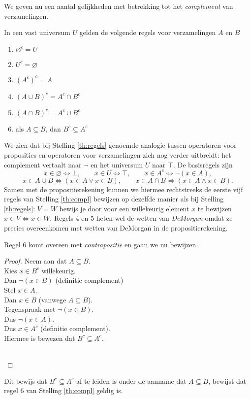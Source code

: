 We geven nu een aantal gelijkheden met betrekking tot het \textit{complement} van verzamelingen.
\begin{theorem}
In een vast universum $U$ gelden de volgende regels voor verzamelingen $A$ en $B$
\begin{enumerate}
    \item $\varnothing^c=U$
    \item $U^c=\varnothing$
    \item $(A^c)^c=A$
    \item $(A\cup B)^c=A^c\cap B^c$
    \item $(A\cap B)^c=A^c\cup B^c$
    \item als $A\subseteq B$, dan $B^c\subseteq A^c$
\end{enumerate}\label{th:compl}
\end{theorem}
We zien dat bij Stelling \ref{th:regels} genoemde analogie tussen operatoren voor proposities en operatoren voor verzamelingen zich nog verder uitbreidt: het complement vertaalt naar $\neg$ en het universum $U$ naar $\top$. De basisregels zijn
$$x\in\varnothing\Leftrightarrow\bot,\qquad x\in U\Leftrightarrow\top,\qquad x\in A^c\Leftrightarrow\neg(x\in A),$$
$$x\in A\cup B\Leftrightarrow(x\in A\lor x\in B),\qquad x\in A\cap B\Leftrightarrow(x\in A\land x\in B).$$
Samen met de propositierekening kunnen we hiermee rechtstreeks de eerste vijf regels van Stelling \ref{th:compl} bewijzen op dezelfde manier als bij Stelling \ref{th:regels}: $V=W$ bewijs je door voor een willekeurig element $x$ te bewijzen $x\in V\Leftrightarrow x\in W$. Regels 4 en 5 heten wel de wetten van \textit{DeMorgan} omdat ze precies overeenkomen met wetten van DeMorgan in de propositierekening.

Regel 6 komt overeen met \textit{contrapositie} en gaan we nu bewijzen.
\begin{proof}\mbox{}

\begin{minipage}{.8\textwidth}
Neem aan dat $A\subseteq B$.\\
Kies $x\in B^c$ willekeurig.\\
Dan $\neg(x\in B)$ (definitie complement)\\
Stel $x\in A$.\\
Dan $x\in B$ (vanwege $A\subseteq B$).\\
Tegenspraak met $\neg(x\in B)$.\\
Dus $\neg(x\in A)$.\\
Dus $x\in A^c$ (definitie complement).\\
Hiermee is bewezen dat $B^c\subseteq A^c$.
\end{minipage}\\
\end{proof}
Dit bewijs dat $B^c\subseteq A^c$ af te leiden is onder de aanname dat $A\subseteq B$, bewijst dat regel 6 van Stelling \ref{th:compl} geldig is.

